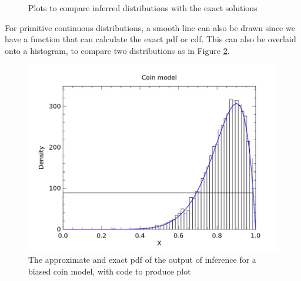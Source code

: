\begin{figure}[!htb]
	\centering
	\qquad
	\caption{Plots to compare inferred distributions with the exact solutions}
	\label{fig:vis-qq}
\end{figure}
				
For primitive continuous distributions, a smooth line can also be drawn since we have a function that can calculate the exact pdf or cdf. This can also be overlaid onto a histogram, to compare two distributions as in Figure \ref{fig:vis-samples}.
				
\begin{figure}[!htb]
	\centering														
	\begin{minipage}{0.45\textwidth}
		\centering
	\end{minipage}
	\begin{minipage}{0.45\textwidth}
		\centering
		\includegraphics[width=\linewidth]{figs/coin_compare.png}
	\end{minipage}
	\caption{The approximate and exact pdf of the output of inference for a biased coin model, with code to produce plot}
	\label{fig:vis-samples}
\end{figure}
				
